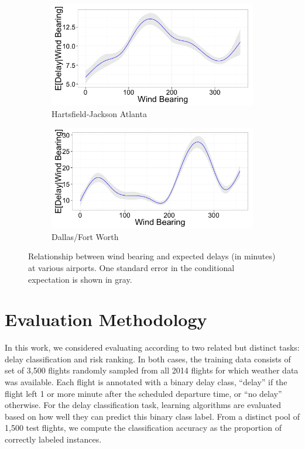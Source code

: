 \documentclass[twocolumn]{article}
\begin{document}
\begin{figure}
\centering
\begin{subfigure}{0.45\textwidth}
    \centering
    \includegraphics[width=\linewidth]{figures/windBearing-ATL.png}
    \caption{Hartsfield-Jackson Atlanta}
\end{subfigure}
\begin{subfigure}{0.45\textwidth}
    \centering
    \includegraphics[width=\linewidth]{figures/windBearing-DFW.png}
    \caption{Dallas/Fort Worth}
\end{subfigure}
\caption{Relationship between wind bearing and expected delays (in minutes) at various airports. One standard error in the conditional expectation is shown in gray.} 
\label{fig:wind-bearing-feature}
\end{figure}


\section{Evaluation Methodology}
\label{sec:evaluation-methodology}

In this work, we considered evaluating according to two related but distinct tasks: delay classification and risk ranking. In both cases, the training data consists of set of 3,500 flights randomly sampled from all 2014 flights for which weather data was available. Each flight is annotated with a binary delay class, ``delay'' if the flight left 1 or more minute after the scheduled departure time, or ``no delay'' otherwise. For the delay classification task, learning algorithms are evaluated based on how well they can predict this binary class label. From a distinct pool of 1,500 test flights, we compute the classification accuracy as the proportion of correctly labeled instances.
\end{document}
